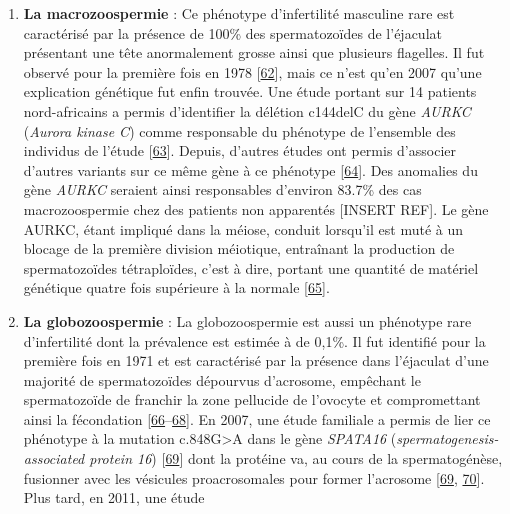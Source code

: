 \documentclass[12pt,twoside]{reedthesis}
\providecommand{\tightlist}{%
  \setlength{\itemsep}{0pt}\setlength{\parskip}{0pt}}
\theoremstyle{definition}
\theoremstyle{definition}
\theoremstyle{remark}
\begin{document}
\begin{enumerate}
    \begin{enumerate}
    \def\labelenumii{\alph{enumii}.}
    \tightlist
    \item
      \textbf{La macrozoospermie} : Ce phénotype d'infertilité masculine
      rare est caractérisé par la présence de 100\% des spermatozoïdes de
      l'éjaculat présentant une tête anormalement grosse ainsi que
      plusieurs flagelles. Il fut observé pour la première fois en 1978
      {[}\protect\hyperlink{ref-Nistal}{62}{]}, mais ce n'est qu'en 2007
      qu'une explication génétique fut enfin trouvée. Une étude portant
      sur 14 patients nord-africains a permis d'identifier la délétion
      c144delC du gène \emph{AURKC} (\emph{Aurora kinase C}) comme
      responsable du phénotype de l'ensemble des individus de l'étude
      {[}\protect\hyperlink{ref-Dieterich2007}{63}{]}. Depuis, d'autres
      études ont permis d'associer d'autres variants sur ce même gène à ce
      phénotype {[}\protect\hyperlink{ref-BenKhelifa2011}{64}{]}. Des
      anomalies du gène \emph{AURKC} seraient ainsi responsables d'environ
      83.7\% des cas macrozoospermie chez des patients non apparentés
      {[}INSERT REF{]}. Le gène AURKC, étant impliqué dans la méiose,
      conduit lorsqu'il est muté à un blocage de la première division
      méiotique, entraînant la production de spermatozoïdes tétraploïdes,
      c'est à dire, portant une quantité de matériel génétique quatre fois
      supérieure à la normale
      {[}\protect\hyperlink{ref-Dieterich2009}{65}{]}.\\
    \item
      \textbf{La globozoospermie} : La globozoospermie est aussi un
      phénotype rare d'infertilité dont la prévalence est estimée à de
      0,1\%. Il fut identifié pour la première fois en 1971 et est
      caractérisé par la présence dans l'éjaculat d'une majorité de
      spermatozoïdes dépourvus d'acrosome, empêchant le spermatozoïde de
      franchir la zone pellucide de l'ovocyte et compromettant ainsi la
      fécondation
      {[}\protect\hyperlink{ref-Dam2006}{66}--\protect\hyperlink{ref-Holstein1973}{68}{]}.
      En 2007, une étude familiale a permis de lier ce phénotype à la
      mutation c.848G\textgreater{}A dans le gène \emph{SPATA16}
      (\emph{spermatogenesis-associated protein 16})
      {[}\protect\hyperlink{ref-Dam2007a}{69}{]} dont la protéine va, au
      cours de la spermatogénèse, fusionner avec les vésicules
      proacrosomales pour former l'acrosome
      {[}\protect\hyperlink{ref-Dam2007a}{69},
      \protect\hyperlink{ref-Lu2006}{70}{]}. Plus tard, en 2011, une étude

\end{enumerate}
\end{enumerate}
\end{document}
